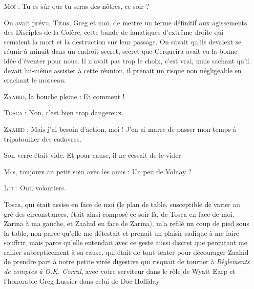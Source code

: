 \begin{dialogue}

\textsc{Moi} : Tu es sûr que tu seras des nôtres, ce soir ?

\end{dialogue}

On avait prévu, Titus, Greg et moi, de mettre un terme définitif aux agissements des Disciples de la Colère, cette bande de fanatiques d’extrême-droite qui semaient la mort et la destruction sur leur passage. On savait qu’ils devaient se réunir à minuit dans un endroit secret, secret que Cerqueira avait eu la bonne idée d’éventer pour nous. Il n’avait pas trop le choix, c’est vrai, mais sachant qu’il devait lui-même assister à cette réunion, il prenait un risque non négligeable en crachant le morceau.

\begin{dialogue}

\textsc{Zaahid}, la bouche pleine : Et comment !

\textsc{Tosca} : Non, c’est bien trop dangereux.

\textsc{Zaahid} : Mais j’ai besoin d’action, moi ! J’en ai marre de passer mon temps à tripatouiller des cadavres.

\end{dialogue}

Son verre était vide. Et pour cause, il ne cessait de le vider.

\begin{dialogue}
    
\textsc{Moi}, toujours au petit soin avec les amis : Un peu de Volnay ?

\textsc{Lui} : Oui, volontiers.
    
\end{dialogue}

Tosca, qui était assise en face de moi (le plan de table, susceptible de varier au gré des circonstances, était ainsi composé ce soir-là, de Tosca en face de moi, Zarina à ma gauche, et Zaahid en face de Zarina), m’a refilé un coup de pied sous la table, non parce qu’elle me détestait et prenait un plaisir sadique à me faire souffrir, mais parce qu’elle entendait avec ce geste aussi discret que percutant me rallier subrepticement à sa cause, qui était de tout tenter pour décourager Zaahid de prendre part à notre petite virée digestive qui risquait de tourner à \textit{Règlements de comptes à O.K. Corral}, avec votre serviteur dans le rôle de Wyatt Earp et l’honorable Greg Lussier dans celui de Doc Holliday.

